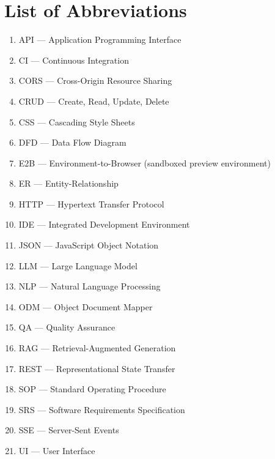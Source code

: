 \chapter*{List of Abbreviations}

\begin{enumerate}
    \item API — Application Programming Interface
    \item CI — Continuous Integration
    \item CORS — Cross-Origin Resource Sharing
    \item CRUD — Create, Read, Update, Delete
    \item CSS — Cascading Style Sheets
    \item DFD — Data Flow Diagram
    \item E2B — Environment-to-Browser (sandboxed preview environment)
    \item ER — Entity-Relationship
    \item HTTP — Hypertext Transfer Protocol
    \item IDE — Integrated Development Environment
    \item JSON — JavaScript Object Notation
    \item LLM — Large Language Model
    \item NLP — Natural Language Processing
    \item ODM — Object Document Mapper
    \item QA — Quality Assurance
    \item RAG — Retrieval-Augmented Generation
    \item REST — Representational State Transfer
    \item SOP — Standard Operating Procedure
    \item SRS — Software Requirements Specification
    \item SSE — Server-Sent Events
    \item UI — User Interface
\end{enumerate}
